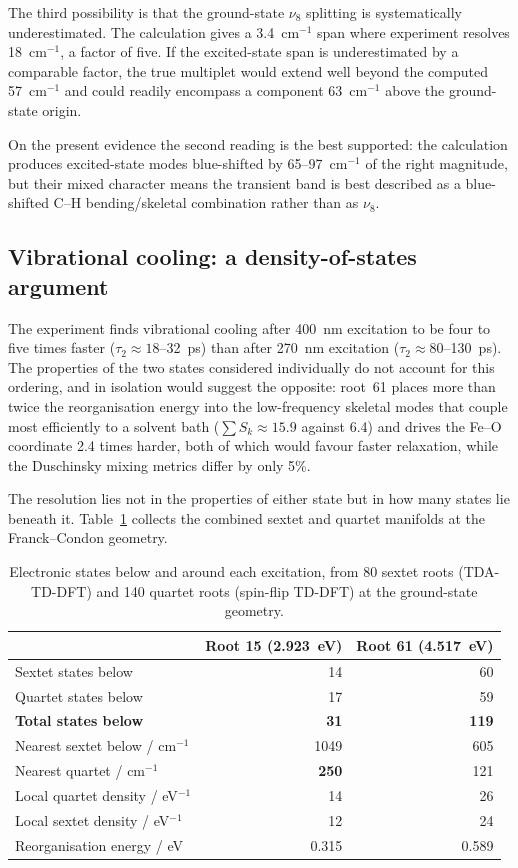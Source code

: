 \documentclass[11pt,a4paper]{article}
\newcommand{\wn}{\ensuremath{\mathrm{cm^{-1}}}}
\begin{document}
The third possibility is that the ground-state $\nu_8$ splitting is
systematically underestimated. The calculation gives a 3.4~\wn{} span where
experiment resolves 18~\wn{}, a factor of five. If the excited-state span is
underestimated by a comparable factor, the true multiplet would extend well
beyond the computed 57~\wn{} and could readily encompass a component
63~\wn{} above the ground-state origin.

On the present evidence the second reading is the best supported: the
calculation produces excited-state modes blue-shifted by 65--97~\wn{} of the
right magnitude, but their mixed character means the transient band is best
described as a blue-shifted C--H bending/skeletal combination rather than as
$\nu_8$.

\subsection{Vibrational cooling: a density-of-states argument}
\label{sec:cool}

The experiment finds vibrational cooling after 400~nm excitation to be four to
five times faster ($\tau_2 \approx 18$--32~ps) than after 270~nm excitation
($\tau_2 \approx 80$--130~ps). The properties of the two states considered
individually do not account for this ordering, and in isolation would suggest
the opposite: root~61 places more than twice the reorganisation energy into the
low-frequency skeletal modes that couple most efficiently to a solvent bath
($\sum S_k \approx 15.9$ against 6.4) and drives the Fe--O coordinate 2.4
times harder, both of which would favour faster relaxation, while the
Duschinsky mixing metrics differ by only 5\%.

The resolution lies not in the properties of either state but in how many
states lie beneath it. Table~\ref{tab:dos} collects the combined sextet and
quartet manifolds at the Franck--Condon geometry.

\begin{table}[htbp]
\centering
\caption{Electronic states below and around each excitation, from 80 sextet
roots (TDA-TD-DFT) and 140 quartet roots (spin-flip TD-DFT) at the
ground-state geometry.}
\label{tab:dos}
\begin{tabular}{l r r}
\toprule
& Root 15 (2.923~eV) & Root 61 (4.517~eV) \\
\midrule
Sextet states below            & 14 & 60 \\
Quartet states below           & 17 & 59 \\
\textbf{Total states below}    & \textbf{31} & \textbf{119} \\
\midrule
Nearest sextet below / \wn{}   & 1049 & 605 \\
Nearest quartet / \wn{}        & \textbf{250} & 121 \\
Local quartet density / eV$^{-1}$ & 14 & 26 \\
Local sextet density / eV$^{-1}$  & 12 & 24 \\
\midrule
Reorganisation energy / eV     & 0.315 & 0.589 \\
\bottomrule
\end{tabular}
\end{table}
\end{document}
